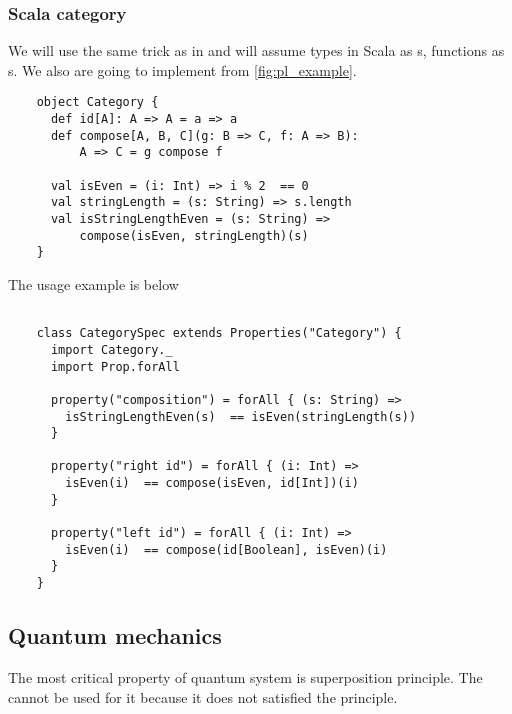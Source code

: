 \subsubsection{\textbf{Scala} category}
\begin{example}
  \label{ex:scalacategory}

  We will use the same trick as in  and
  will assume 
  types in Scala as s, 
  functions as s.
  We also are going to implement
   from \cref{fig:pl_example}.

  \begin{verbatim}
    object Category {
      def id[A]: A => A = a => a
      def compose[A, B, C](g: B => C, f: A => B): 
          A => C = g compose f 
      
      val isEven = (i: Int) => i % 2  == 0
      val stringLength = (s: String) => s.length
      val isStringLengthEven = (s: String) => 
          compose(isEven, stringLength)(s)
    }
  \end{verbatim}

  The usage example is below
  \begin{verbatim}
    
    class CategorySpec extends Properties("Category") {
      import Category._
      import Prop.forAll
      
      property("composition") = forAll { (s: String) =>
        isStringLengthEven(s)  == isEven(stringLength(s))
      }
      
      property("right id") = forAll { (i: Int) =>
        isEven(i)  == compose(isEven, id[Int])(i)
      }
      
      property("left id") = forAll { (i: Int) =>
        isEven(i)  == compose(id[Boolean], isEven)(i)
      }
    }
  \end{verbatim}
\end{example}


\subsection{Quantum mechanics}
The most critical property of quantum system is superposition
principle. The  cannot be used for it
because it does not satisfied the principle. 

